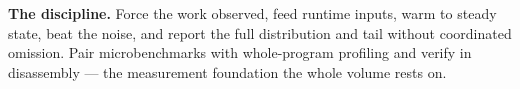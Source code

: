 \textbf{The discipline.} Force the work observed, feed runtime inputs, warm to steady state, beat the noise, and report the full distribution and tail without coordinated omission. Pair microbenchmarks with whole-program profiling and verify in disassembly --- the measurement foundation the whole volume rests on.
